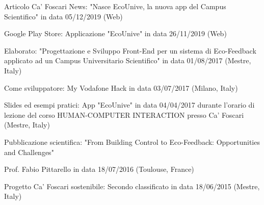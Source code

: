 
\begin{activities}
    {Articolo Ca' Foscari News: "Nasce EcoUnive, la nuova app del Campus Scientifico" in data 05/12/2019 (Web)}

    {Google Play Store: Applicazione "EcoUnive" in data 26/11/2019 (Web)}

    {Elaborato: "Progettazione e Sviluppo Front-End per un sistema di Eco-Feedback applicato ad un Campus Universitario Scientifico" in data 01/08/2017 (Mestre, Italy)}

    {Come sviluppatore: My Vodafone Hack in data 03/07/2017 (Milano, Italy)}

    {Slides ed esempi pratici: App "EcoUnive" in data 04/04/2017 durante l'orario di lezione del corso HUMAN-COMPUTER INTERACTION presso Ca' Foscari (Mestre, Italy)}

    {Pubblicazione scientifica: "From Building Control to Eco-Feedback: Opportunities and Challenges"}

    \activitiesentry{}
    {Prof. Fabio Pittarello in data 18/07/2016 (Toulouse, France)}

    {Progetto Ca' Foscari sostenibile: Secondo classificato in data 18/06/2015 (Mestre, Italy)}
\end{activities}
